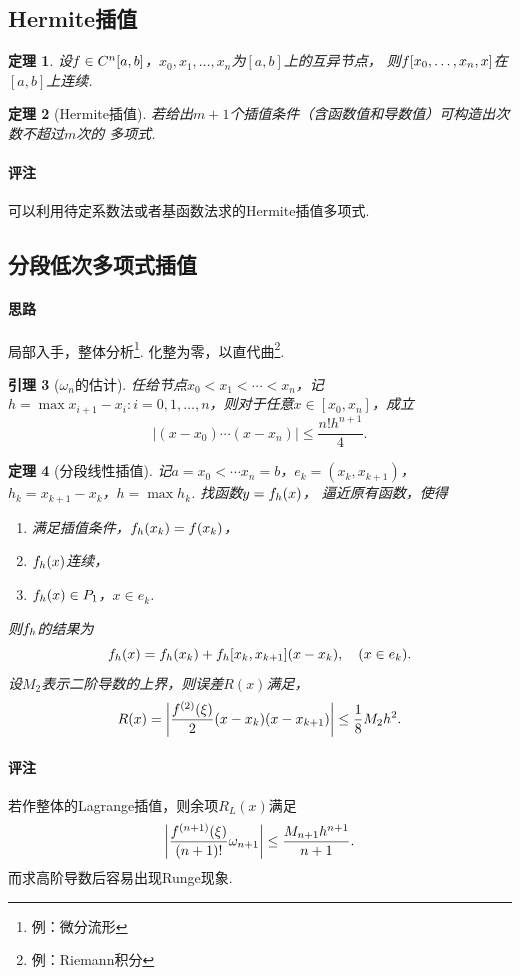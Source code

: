 \documentclass[12pt, a4paper]{article}
\theoremstyle{margin}
\newtheorem{thm}{定理}
\newtheorem{lemma}[thm]{引理}
\newcommand{\f}{\mathnormal{f}}
\newcommand{\remark}{\paragraph{评注}}
\begin{document}
\subsection{Hermite插值}
  \begin{thm}
    设$\f\in C^n[a,b]$，$x_0,x_1,\dots,x_n$为$[a, b]$上的互异节点，
    则$\f[x_0,\dots,x_n,x]$在$[a, b]$上连续.
  \end{thm}

  \begin{thm}[Hermite插值]
    若给出$m+1$个插值条件（含函数值和导数值）可构造出次数不超过$m$次的
    多项式.
  \end{thm}
  \remark
    可以利用待定系数法或者基函数法求的Hermite插值多项式.

\subsection{分段低次多项式插值}
  \paragraph{思路}
    局部入手，整体分析\footnote{例：微分流形}.
    化整为零，以直代曲\footnote{例：Riemann积分}.

  \begin{lemma}[$\omega_n$的估计]
    任给节点$x_0<x_1<\cdots<x_n$，记$h = \max{x_{i+1}-x_i:
    i=0,1,\dots,n}$，则对于任意$x\in[x_0,x_n]$，成立
    \[
      |(x-x_0)\cdots(x-x_n)| \le \frac{n!h^{n+1}}{4}.
    \]
  \end{lemma}

  \begin{thm}[分段线性插值]
    记$a = x_0 < \cdots x_n = b$，$e_k = (x_k, x_{k+1})$，
    $h_k = x_{k+1} - x_k$，$h = \max h_k$. 找函数$y=\f_h(x)$，
    逼近原有函数，使得
    \begin{enumerate}
      \item 满足插值条件，$\f_h(x_k) = \f(x_k)$，
      \item $\f_h(x)$连续，
      \item $\f_h(x)\in P_1$，$x\in e_k$.
    \end{enumerate}
    则$\f_h$的结果为
    \[
      \f_h(x) = \f_h(x_k) + \f_h[x_k, x_{k+1}](x-x_k),
      \quad(x\in e_k).
    \]
    设$M_2$表示二阶导数的上界，则误差$R(x)$满足，
    \[
      R(x) = \left|\frac{\f^{(2)}(\xi)}{2}(x-x_k)(x-x_{k+1})\right|
      \le \frac{1}{8}M_2h^2.
    \]
  \end{thm}
  \remark
    若作整体的Lagrange插值，则余项$R_L(x)$满足
    \[
      \left|\frac{\f^{(n+1)}(\xi)}{(n+1)!}\omega_{n+1}\right|
      \le \frac{M_{n+1}h^{n+1}}{n+1}.
    \]
    而求高阶导数后容易出现Runge现象.
\end{document}
